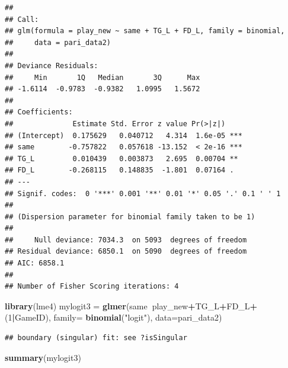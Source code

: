 \documentclass[]{book}
\newenvironment{Shaded}{\begin{snugshade}}{\end{snugshade}}
\newcommand{\DataTypeTok}[1]{\textcolor[rgb]{0.13,0.29,0.53}{#1}}
\newcommand{\DecValTok}[1]{\textcolor[rgb]{0.00,0.00,0.81}{#1}}
\newcommand{\KeywordTok}[1]{\textcolor[rgb]{0.13,0.29,0.53}{\textbf{#1}}}
\newcommand{\NormalTok}[1]{#1}
\newcommand{\OperatorTok}[1]{\textcolor[rgb]{0.81,0.36,0.00}{\textbf{#1}}}
\newcommand{\StringTok}[1]{\textcolor[rgb]{0.31,0.60,0.02}{#1}}
\begin{document}
\begin{verbatim}
## 
## Call:
## glm(formula = play_new ~ same + TG_L + FD_L, family = binomial, 
##     data = pari_data2)
## 
## Deviance Residuals: 
##     Min       1Q   Median       3Q      Max  
## -1.6114  -0.9783  -0.9382   1.0995   1.5672  
## 
## Coefficients:
##              Estimate Std. Error z value Pr(>|z|)    
## (Intercept)  0.175629   0.040712   4.314  1.6e-05 ***
## same        -0.757822   0.057618 -13.152  < 2e-16 ***
## TG_L         0.010439   0.003873   2.695  0.00704 ** 
## FD_L        -0.268115   0.148835  -1.801  0.07164 .  
## ---
## Signif. codes:  0 '***' 0.001 '**' 0.01 '*' 0.05 '.' 0.1 ' ' 1
## 
## (Dispersion parameter for binomial family taken to be 1)
## 
##     Null deviance: 7034.3  on 5093  degrees of freedom
## Residual deviance: 6850.1  on 5090  degrees of freedom
## AIC: 6858.1
## 
## Number of Fisher Scoring iterations: 4
\end{verbatim}

\begin{Shaded}
\begin{Highlighting}[]
\KeywordTok{library}\NormalTok{(lme4)}
\NormalTok{mylogit3 =}\StringTok{ }\KeywordTok{glmer}\NormalTok{(same}\OperatorTok{~}\NormalTok{play_new}\OperatorTok{+}\NormalTok{TG_L}\OperatorTok{+}\NormalTok{FD_L}\OperatorTok{+}\NormalTok{(}\DecValTok{1}\OperatorTok{|}\NormalTok{GameID), }\DataTypeTok{family=} \KeywordTok{binomial}\NormalTok{(}\StringTok{"logit"}\NormalTok{), }\DataTypeTok{data=}\NormalTok{pari_data2)}
\end{Highlighting}
\end{Shaded}

\begin{verbatim}
## boundary (singular) fit: see ?isSingular
\end{verbatim}

\begin{Shaded}
\begin{Highlighting}[]
\KeywordTok{summary}\NormalTok{(mylogit3)}
\end{Highlighting}
\end{Shaded}
\end{document}
